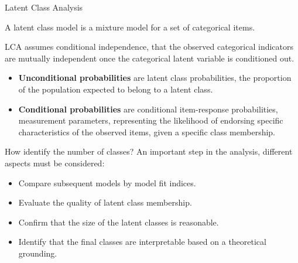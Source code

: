 \documentclass[11pt,t]{beamer}
\begin{document}
\begin{frame}[c,plain]{Latent Class Analysis}
\vspace{-11pt}

A latent class model is a mixture model for a set of categorical items.  
\vspace{11pt}

LCA assumes conditional independence, that the observed categorical indicators are mutually independent once the categorical latent variable is conditioned out.
\vspace{11pt}

\begin{itemize}
\item \textbf{Unconditional probabilities} are latent class probabilities, the proportion of the population expected to belong to a latent class.  
\vspace{2pt}
\item \textbf{Conditional probabilities} are conditional item-response probabilities, measurement parameters, representing the likelihood of endorsing specific characteristics of the observed items, given a specific class membership.
\end{itemize}
		
\end{frame}

\begin{frame}[c,plain]{How identify the number of classes?}
\vspace{-11pt}
An important step in the analysis, different aspects must be considered:
\vspace{11pt}

\begin{itemize}
\item Compare subsequent models by model fit indices.  
\item Evaluate the quality of latent class membership.  
\item Confirm that the size of the latent classes is reasonable.  
\item Identify that the final classes are interpretable based on a theoretical grounding.
\end{itemize}	
\end{frame}
\end{document}
